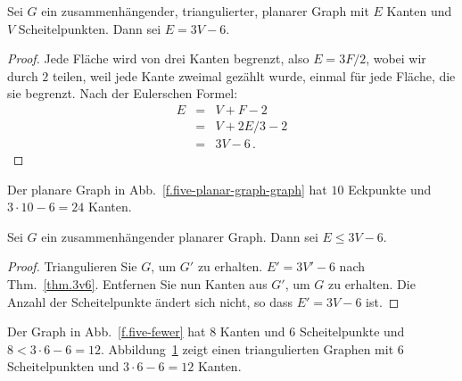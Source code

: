 \begin{theorem}\label{thm.3v6}
Sei $G$ ein zusammenhängender, triangulierter, planarer Graph mit $E$ Kanten und $V$ Scheitelpunkten. Dann sei $E= 3V-6$.
\end{theorem}
\begin{proof}
Jede Fläche wird von drei Kanten begrenzt, also $E=3F/2$, wobei wir durch $2$ teilen, weil jede Kante zweimal gezählt wurde, einmal für jede Fläche, die sie begrenzt. Nach der Eulerschen Formel:
\begin{eqnarray*}
E&=&V+F-2\\
&=&V+2E/3-2\\
&=&3V-6\,.
\end{eqnarray*}
\end{proof}

\begin{example}
Der planare Graph in Abb.~\ref{f.five-planar-graph-graph} hat $10$ Eckpunkte und $3\cdot 10-6=24$ Kanten.
\end{example}

\begin{theorem}\label{thm.count}
Sei $G$ ein zusammenhängender planarer Graph. Dann sei $E\leq 3V-6$.
\end{theorem}

\begin{proof}
Triangulieren Sie $G$, um $G'$ zu erhalten. $E'= 3V'-6$ nach Thm.~\ref{thm.3v6}. Entfernen Sie nun Kanten aus $G'$, um $G$ zu erhalten. Die Anzahl der Scheitelpunkte ändert sich nicht, so dass $E'= 3V-6$ ist.
\end{proof}

\begin{example}
Der Graph in Abb.~\ref{f.five-fewer} hat $8$ Kanten und $6$ Scheitelpunkte und $8< 3\cdot 6 - 6= 12$.
Abbildung~\ref{f.five-upper-limit} zeigt einen triangulierten Graphen mit $6$ Scheitelpunkten und $3\cdot 6 - 6= 12$ Kanten.
\end{example}

\begin{figure}[hb]
\subfigures
{}
\hfill
{}
\label{f.five-fewer}
\label{f.five-upper-limit}
\end{figure}

